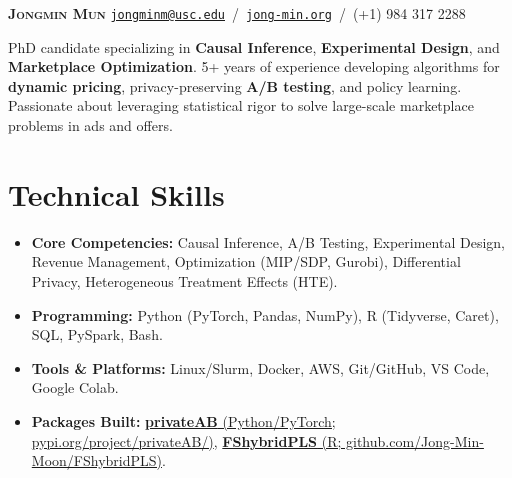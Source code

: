 \documentclass[letterpaper,11pt]{article}
\begin{document}
	\begin{flushleft}		
		\Large{\textbf{{\scshape Jongmin Mun} }}
\hspace{140pt}
		\normalsize{	\href{mailto:jongminm@usc.edu}{\texttt{jongminm@usc.edu}}
			\,/\,
			\href{https://jong-min.org/}{\texttt{jong-min.org}}
			\,/\,
	(+1) 984 317 2288}
		\end{flushleft}
		\vspace{-5.55pt}
PhD candidate specializing in \textbf{Causal Inference}, \textbf{Experimental Design}, and \textbf{Marketplace Optimization}. 5+ years of experience developing algorithms for \textbf{dynamic pricing}, privacy-preserving \textbf{A/B testing}, and policy learning. Passionate about leveraging statistical rigor to solve large-scale marketplace problems in ads and offers.\vspace{-7.6pt}
	\section{Technical Skills}
\begin{itemize}[leftmargin=0.14in]
    \item \textbf{Core Competencies:} Causal Inference, A/B Testing, Experimental Design, Revenue Management, Optimization (MIP/SDP, Gurobi), Differential Privacy, Heterogeneous Treatment Effects (HTE).
    \vspace{-7.55pt}
    \item \textbf{Programming:} Python (PyTorch, Pandas, NumPy), R (Tidyverse, Caret), SQL, PySpark, Bash.
    \vspace{-7.55pt}
    \item \textbf{Tools \& Platforms:} Linux/Slurm, Docker, AWS, Git/GitHub, VS Code, Google Colab.
    \vspace{-7.55pt}
    \item \textbf{Packages Built:}
    \href{https://pypi.org/project/privateAB/}{\textbf{privateAB} (Python/PyTorch; pypi.org/project/privateAB/)},
    \href{https://github.com/Jong-Min-Moon/FShybridPLS}{\textbf{FShybridPLS} (R; github.com/Jong-Min-Moon/FShybridPLS)}.
\end{itemize}
\vspace{-12.55pt}
%

%
%
%
\end{document}
